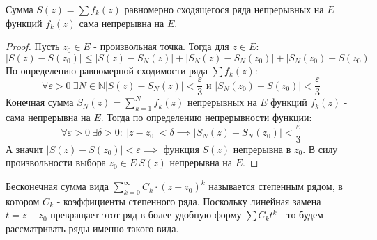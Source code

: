 \begin{theorem*}
    Сумма $S(z) = \sum f_k(z)$ равномерно сходящегося ряда непрерывных на $E$ функций $f_k(z)$ сама непрерывна на $E$.

    \begin{proof}
        Пусть $z_0 \in E$ - произвольная точка. Тогда для $z \in E$:
        \[\left| S(z) - S(z_0) \right| \leq \left|S(z) - S_N(z)\right| + \left| S_N(z) - S_N(z_0)\right| + \left|S_N(z_0) - S(z_0)\right|\]
        По определению равномерной сходимости ряда $\sum f_k(z)$:
        \[\forall \varepsilon > 0 \ \exists N \in \mathbb{N} \left| S(z) - S_N(z)\right| < \frac{\varepsilon}{3} \text{ и } \left| S_N(z_0) - S(z_0)\right| < \frac{\varepsilon}{3}\]
        Конечная сумма $S_N(z) = \sum_{k=1}^{N}f_k(z)$ непрерывных на $E$ функций $f_k(z)$ - сама непрерывна на $E$. Тогда по определению непрерывности функции:
        \[\forall \varepsilon > 0 \ \exists \delta > 0: \ \left|z - z_0\right| < \delta \implies \left|S_N(z) - S_N(z_0)\right| < \frac{\varepsilon}{3}\]
        А значит $\left|S(z) - S(z_0) \right|< \varepsilon \implies$ функция $S(z)$ непрерывна в $z_0$. В силу произвольности выбора $z_0 \in E \ S(z)$ непрерывна на $E$. 
    \end{proof}
\end{theorem*}

\begin{definition}
    Бесконечная сумма вида $\sum_{k=0}^{\infty}C_k\cdot(z-z_0)^k$ называется степенным рядом, в котором $C_k$ - коэффициенты степенного ряда. 
    \newline
    Поскольку линейная замена $t = z - z_0$ превращает этот ряд в более удобную форму $\sum C_k t^k$ - то будем рассматривать ряды именно такого вида.
\end{definition}

